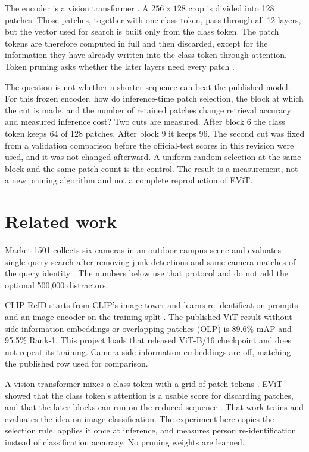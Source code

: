 \documentclass[11pt]{article}
\begin{document}
The encoder is a vision transformer \cite{dosovitskiy2021vit}.
A $256 \times 128$ crop is divided into 128 patches.
Those patches, together with one class token, pass through all 12 layers, but the vector used for search is built only from the class token.
The patch tokens are therefore computed in full and then discarded, except for the information they have already written into the class token through attention.
Token pruning asks whether the later layers need every patch \cite{liang2022evit}.

The question is not whether a shorter sequence can beat the published model.
For this frozen encoder, how do inference-time patch selection, the block at which the cut is made, and the number of retained patches change retrieval accuracy and measured inference cost?
Two cuts are measured.
After block 6 the class token keeps 64 of 128 patches.
After block 9 it keeps 96.
The second cut was fixed from a validation comparison before the official-test scores in this revision were used, and it was not changed afterward.
A uniform random selection at the same block and the same patch count is the control.
The result is a measurement, not a new pruning algorithm and not a complete reproduction of EViT.

\section{Related work}
Market-1501 collects six cameras in an outdoor campus scene and evaluates single-query search after removing junk detections and same-camera matches of the query identity \cite{zheng2015market}.
The numbers below use that protocol and do not add the optional 500{,}000 distractors.

CLIP-ReID starts from CLIP's image tower and learns re-identification prompts and an image encoder on the training split \cite{li2023clipreid}.
The published ViT result without side-information embeddings or overlapping patches (OLP) is 89.6\% mAP and 95.5\% Rank-1.
This project loads that released ViT-B/16 checkpoint and does not repeat its training.
Camera side-information embeddings are off, matching the published row used for comparison.

A vision transformer mixes a class token with a grid of patch tokens \cite{dosovitskiy2021vit}.
EViT showed that the class token's attention is a usable score for discarding patches, and that the later blocks can run on the reduced sequence \cite{liang2022evit}.
That work trains and evaluates the idea on image classification.
The experiment here copies the selection rule, applies it once at inference, and measures person re-identification instead of classification accuracy.
No pruning weights are learned.
\end{document}
